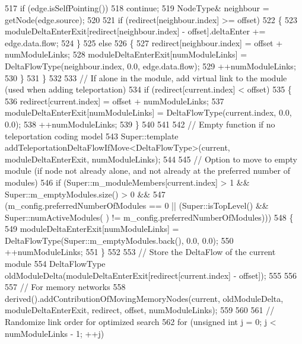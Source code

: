 \begin{DoxyCode}
517             \textcolor{keywordflow}{if} (edge.isSelfPointing())
518                 \textcolor{keywordflow}{continue};
519             NodeType& neighbour = getNode(edge.source);
520 
521             \textcolor{keywordflow}{if} (redirect[neighbour.index] >= offset)
522             \{
523                 moduleDeltaEnterExit[redirect[neighbour.index] - offset].deltaEnter += edge.data.flow;
524             \}
525             \textcolor{keywordflow}{else}
526             \{
527                 redirect[neighbour.index] = offset + numModuleLinks;
528                 moduleDeltaEnterExit[numModuleLinks] = DeltaFlowType(neighbour.index, 0.0, edge.data.flow);
529                 ++numModuleLinks;
530             \}
531         \}
532 
533         \textcolor{comment}{// If alone in the module, add virtual link to the module (used when adding teleportation)}
534         \textcolor{keywordflow}{if} (redirect[current.index] < offset)
535         \{
536             redirect[current.index] = offset + numModuleLinks;
537             moduleDeltaEnterExit[numModuleLinks] = DeltaFlowType(current.index, 0.0, 0.0);
538             ++numModuleLinks;
539         \}
540 
541 
542         \textcolor{comment}{// Empty function if no teleportation coding model}
543         Super::template addTeleportationDeltaFlowIfMove<DeltaFlowType>(current, moduleDeltaEnterExit, 
      numModuleLinks);
544 
545         \textcolor{comment}{// Option to move to empty module (if node not already alone, and not already at the preferred
       number of modules)}
546         \textcolor{keywordflow}{if} (Super::m\_moduleMembers[current.index] > 1 && Super::m\_emptyModules.size() > 0 &&
547                 (m\_config.preferredNumberOfModules == 0 || (Super::isTopLevel() && Super::numActiveModules(
      ) != m\_config.preferredNumberOfModules)))
548         \{
549             moduleDeltaEnterExit[numModuleLinks] = DeltaFlowType(Super::m\_emptyModules.back(), 0.0, 0.0);
550             ++numModuleLinks;
551         \}
552 
553         \textcolor{comment}{// Store the DeltaFlow of the current module}
554         DeltaFlowType oldModuleDelta(moduleDeltaEnterExit[redirect[current.index] - offset]);
555 
556 
557         \textcolor{comment}{// For memory networks}
558         derived().addContributionOfMovingMemoryNodes(current, oldModuleDelta, moduleDeltaEnterExit, 
      redirect, offset, numModuleLinks);
559 
560 
561         \textcolor{comment}{// Randomize link order for optimized search}
562         \textcolor{keywordflow}{for} (\textcolor{keywordtype}{unsigned} \textcolor{keywordtype}{int} j = 0; j < numModuleLinks - 1; ++j)

\end{DoxyCode}
